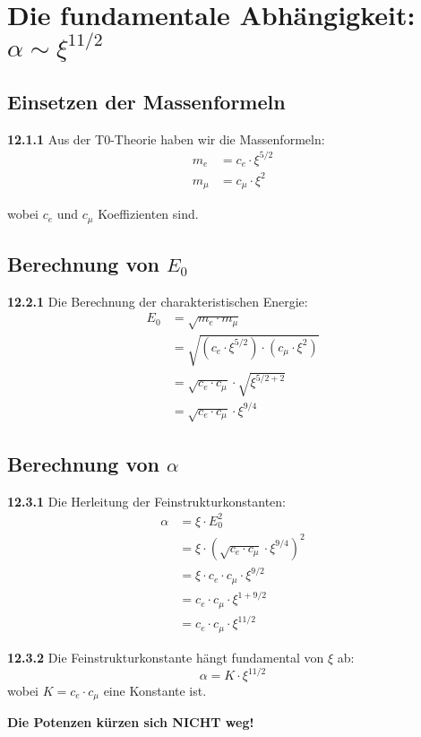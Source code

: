\documentclass[12pt,a4paper]{article}
\begin{document}
\section{Die fundamentale Abhängigkeit: $\alpha \sim \xi^{11/2}$}

\subsection{Einsetzen der Massenformeln}

\noindent \textbf{12.1.1} Aus der T0-Theorie haben wir die Massenformeln:
\begin{align}
	m_e &= c_e \cdot \xi^{5/2} \\
	m_\mu &= c_\mu \cdot \xi^2
\end{align}

wobei $c_e$ und $c_\mu$ Koeffizienten sind.

\subsection{Berechnung von $E_0$}

\noindent \textbf{12.2.1} Die Berechnung der charakteristischen Energie:
\begin{align}
	E_0 &= \sqrt{m_e \cdot m_\mu} \\
	&= \sqrt{(c_e \cdot \xi^{5/2}) \cdot (c_\mu \cdot \xi^2)} \\
	&= \sqrt{c_e \cdot c_\mu} \cdot \sqrt{\xi^{5/2 + 2}} \\
	&= \sqrt{c_e \cdot c_\mu} \cdot \xi^{9/4}
\end{align}

\subsection{Berechnung von $\alpha$}

\noindent \textbf{12.3.1} Die Herleitung der Feinstrukturkonstanten:
\begin{align}
	\alpha &= \xi \cdot E_0^2 \\
	&= \xi \cdot (\sqrt{c_e \cdot c_\mu} \cdot \xi^{9/4})^2 \\
	&= \xi \cdot c_e \cdot c_\mu \cdot \xi^{9/2} \\
	&= c_e \cdot c_\mu \cdot \xi^{1 + 9/2} \\
	&= c_e \cdot c_\mu \cdot \xi^{11/2}
\end{align}

\begin{tcolorbox}[colback=red!5!white,colframe=red!75!black,title=\textbf{WICHTIGES ERGEBNIS}]
	\noindent \textbf{12.3.2} Die Feinstrukturkonstante hängt fundamental von $\xi$ ab:
	\begin{equation}
		\boxed{\alpha = K \cdot \xi^{11/2}}
	\end{equation}
	wobei $K = c_e \cdot c_\mu$ eine Konstante ist.
	
	\textbf{Die Potenzen kürzen sich NICHT weg!}
\end{tcolorbox}
\end{document}
